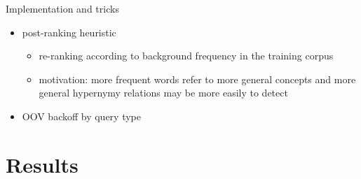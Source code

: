 \documentclass{beamer}
\newlength{\onecolwid}
\begin{document}
\begin{frame}[t]
\begin{columns}[t]
\begin{column}{\onecolwid}
\begin{block}{Implementation and tricks}
\begin{itemize}
      \item \alert{post-ranking} heuristic
        \begin{itemize}
          \item re-ranking according to background frequency in the training corpus
          \item motivation: more frequent words refer to more general concepts
            and more general hypernymy relations may be more easily to detect
        \end{itemize}
      \item \alert{OOV backoff} by query type

  \end{itemize}
\end{block}

  \section{Results} \label{sec:results}




\end{column}
\end{columns}
\end{frame}
\end{document}
